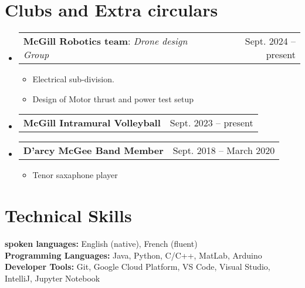 \documentclass[letterpaper,11pt]{article}
\makeatletter
\newcommand{\resumeItem}[1]{
  \item\small{
    {#1 \vspace{-2pt}}
  }
}
\newcommand{\resumeProjectHeading}[2]{
    \item
    \begin{tabular*}{0.97\textwidth}{l@{\extracolsep{\fill}}r}
      \small#1 & #2 \\
    \end{tabular*}\vspace{-7pt}
}
\newcommand{\resumeSubHeadingListStart}{\begin{itemize}[leftmargin=0.15in, label={}]}
\newcommand{\resumeSubHeadingListEnd}{\end{itemize}}
\newcommand{\resumeItemListStart}{\begin{itemize}}
\newcommand{\resumeItemListEnd}{\end{itemize}\vspace{-5pt}}
\makeatother
\begin{document}
\section{Clubs and Extra circulars}
\resumeSubHeadingListStart
\resumeProjectHeading
{\textbf{McGill Robotics team}: \emph{Drone design Group}}{Sept. 2024 -- present}
\resumeItemListStart
\resumeItem{Electrical sub-division.}
\resumeItem{Design of Motor thrust and power test setup}
\resumeItemListEnd

\resumeProjectHeading
{\textbf{McGill Intramural Volleyball}}{Sept. 2023 -- present}

\resumeProjectHeading
{\textbf{D'arcy McGee Band Member}}{Sept. 2018 -- March 2020}
\resumeItemListStart
\resumeItem{Tenor saxaphone player}
\resumeItemListEnd

\resumeSubHeadingListEnd
\section{Technical Skills}
\begin{itemize}[leftmargin=0.15in, label={}]
  \small{\item{
        \textbf{spoken languages: }{English (native), French (fluent)} \\
        \textbf{Programming Languages: }{Java, Python, C/C++, MatLab, Arduino} \\
        \textbf{Developer Tools: }{Git, Google Cloud Platform, VS Code, Visual Studio, IntelliJ, Jupyter Notebook} \\
        }}
\end{itemize}

\end{document}
